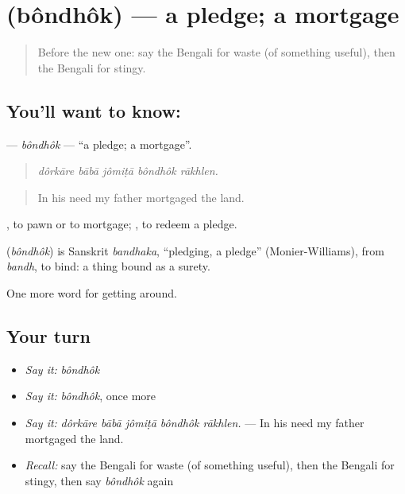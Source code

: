 \section[\texorpdfstring{\bn{বন্ধক} (bôndhôk)}{বন্ধক (bôndhôk)}]{ (bôndhôk) — a pledge; a mortgage}

\label{lesson:BN-C419-bondhok}



\begin{quote}
Before the new one: say the Bengali for waste (of something useful), then the Bengali for stingy.
\end{quote}

\subsection*{You'll want to know: }
\textbf{} — \emph{bôndhôk} — \textquotedblleft{}a pledge; a mortgage\textquotedblright{}.

\begin{quote}
    
\end{quote}

\begin{quote}
\emph{dôrkāre bābā jômiṭā bôndhôk rākhlen.}
\end{quote}

\begin{quote}
In his need my father mortgaged the land.
\end{quote}

 , to pawn or to mortgage;  , to redeem a pledge.

\begin{cousinweb}
\textbf{} (\emph{bôndhôk}) is Sanskrit \emph{bandhaka}, \textquotedblleft{}pledging, a pledge\textquotedblright{} (Monier-Williams), from \emph{bandh}, to bind: a thing bound as a surety.
\end{cousinweb}

\begin{grammarlens}[title={What you've built}]
One more word for getting around.
\end{grammarlens}

\subsection*{Your turn}
\begin{itemize}
\raggedright
  \item \emph{Say it:} \emph{bôndhôk}
  \item \emph{Say it:} \emph{bôndhôk}, once more
  \item \emph{Say it:} \emph{dôrkāre bābā jômiṭā bôndhôk rākhlen.} — In his need my father mortgaged the land.
  \item \emph{Recall:} say the Bengali for waste (of something useful), then the Bengali for stingy, then say \emph{bôndhôk} again
\end{itemize}

